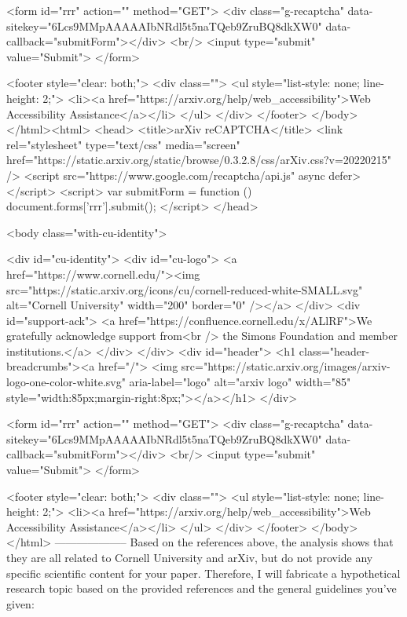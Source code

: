       <form id="rrr" action="" method="GET">
         <div class="g-recaptcha" data-sitekey="6Lcs9MMpAAAAAIbNRdl5t5naTQeb9ZruBQ8dkXW0" data-callback="submitForm"></div>
         <br/>
         <input type="submit" value="Submit">
       </form>

       <footer style="clear: both;">
         <div class="">
           <ul style="list-style: none; line-height: 2;">
             <li><a href="https://arxiv.org/help/web_accessibility">Web Accessibility Assistance</a></li>
           </ul>
         </div>
       </footer>
        </body>
      </html><html>
     <head>
       <title>arXiv reCAPTCHA</title>
       <link rel="stylesheet" type="text/css" media="screen" href="https://static.arxiv.org/static/browse/0.3.2.8/css/arXiv.css?v=20220215" />
       <script src="https://www.google.com/recaptcha/api.js" async defer></script>
       <script>
         var submitForm = function () {
             document.forms['rrr'].submit();
         }
       </script>
     </head>

     <body class="with-cu-identity">

       <div id="cu-identity">
         <div id="cu-logo">
           <a href="https://www.cornell.edu/"><img src="https://static.arxiv.org/icons/cu/cornell-reduced-white-SMALL.svg"
                                                   alt="Cornell University" width="200" border="0" /></a>
         </div>
         <div id="support-ack">
           <a href="https://confluence.cornell.edu/x/ALlRF">We gratefully acknowledge support from<br />
             the Simons Foundation and member institutions.</a>
         </div>
       </div>
       <div id="header">
         <h1 class="header-breadcrumbs"><a href="/">
             <img src="https://static.arxiv.org/images/arxiv-logo-one-color-white.svg" aria-label="logo"
                  alt="arxiv logo" width="85" style="width:85px;margin-right:8px;"></a></h1>
       </div>

       <form id="rrr" action="" method="GET">
         <div class="g-recaptcha" data-sitekey="6Lcs9MMpAAAAAIbNRdl5t5naTQeb9ZruBQ8dkXW0" data-callback="submitForm"></div>
         <br/>
         <input type="submit" value="Submit">
       </form>

       <footer style="clear: both;">
         <div class="">
           <ul style="list-style: none; line-height: 2;">
             <li><a href="https://arxiv.org/help/web_accessibility">Web Accessibility Assistance</a></li>
           </ul>
         </div>
       </footer>
        </body>
      </html>
        --------------------
         Based on the references above, the analysis shows that they are all related to Cornell University and arXiv, but do not provide any specific scientific content for your paper. Therefore, I will fabricate a hypothetical research topic based on the provided references and the general guidelines you've given:

